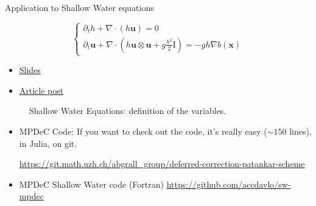 \documentclass[9pt,compress,t,aspectratio=169]{beamer}
\newcommand{\bu}{\mathbf{u}}
\newcommand{\1}{\begin{pmatrix}
                 1\\
                 1
                \end{pmatrix}}
\renewcommand{\vec}[1]{\underline{#1}}
\begin{document}
\begin{frame}{Application to Shallow Water equations}
	\begin{minipage}{0.48\textwidth}
		$$
		\begin{cases}
			\partial_t h  + \nabla \cdot (h \bu) = 0\\
			\partial_t \bu + \nabla \cdot ( h \bu \otimes \bu + g \frac{h^2}{2} \mathrm{I})= - g h \nabla b(\mathbf{x})
		\end{cases}
		$$
		\begin{itemize}
			\item	\href{https://davidetorlo.it/files/talks/mpdecsw_honom22.pdf}{Slides}\\
			\item	\href{https://davidetorlo.it/publication/2021-10-27-sw-mpdec}{Article post}				
		\end{itemize}
	\end{minipage}\hfill
	\begin{minipage}{0.48\textwidth}
		\begin{figure}
			\centering
			\caption{Shallow Water Equations: definition of the variables.}\label{fig:SWE}
		\end{figure}
			
	\end{minipage}


	\begin{itemize}
		\item MPDeC Code: If you want to check out the code, it's really easy ($\sim 150$ lines), in Julia, on git.

		\url{https://git.math.uzh.ch/abgrall_group/deferred-correction-patankar-scheme}
		
		\item MPDeC Shallow Water code (Fortran)
		\url{https://github.com/accdavlo/sw-mpdec}
	\end{itemize}

\end{frame}
\end{document}

